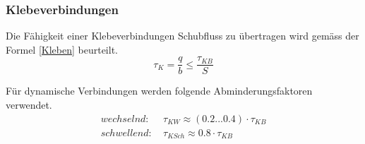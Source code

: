 
  \subsubsection{Klebeverbindungen}
  Die Fähigkeit einer Klebeverbindungen Schubfluss zu übertragen wird gemäss der Formel \ref{Kleben} beurteilt.
  \begin{equation}
    \label{Kleben}
    \tau_K = \frac{q}{b} \leq \frac{\tau_{KB}}{S}
  \end{equation}

  Für dynamische Verbindungen werden folgende Abminderungsfaktoren verwendet. \cite{klein}
  \begin{equation}
    \label{Zulässige Schubspannungen}
    \begin{split}
    wechselnd: & \: \tau_{KW} \approx \left (0.2 ... 0.4 \right ) \cdot \tau_{KB}\\
    schwellend: & \: \tau_{KSch} \approx 0.8 \cdot \tau_{KB}
    \end{split}
  \end{equation}

